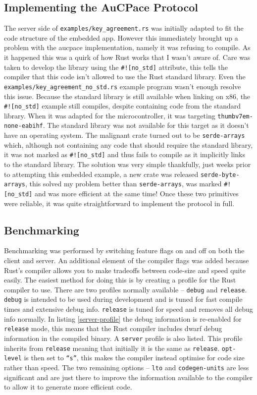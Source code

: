 \subsection{Implementing the AuCPace Protocol}
The server side of \texttt{examples/key\_agreement.rs} was initially adapted to fit the code structure of the embedded app.
However this immediately brought up a problem with the \gls{aucpace} implementation, namely it was refusing to compile.
As it happened this was a quirk of how Rust works that I wasn't aware of.
Care was taken to develop the library using the \verb|#![no_std]| attribute, this tells the compiler that this code isn't allowed to use the Rust standard library.
Even the \texttt{examples/key\_agreement\_no\_std.rs} example program wasn't enough resolve this issue.
Because the standard library is still available when linking on x86, the \verb|#![no_std]| example still compiles, despite containing code from the standard library.
When it was adapted for the microcontroller, it was targeting \texttt{thumbv7em-none-eabihf}.
The standard library was not available for this target as it doesn't have an operating system.
The malignant crate turned out to be \texttt{serde-arrays} which, although not containing any code that should require the standard library, it was not marked as \verb|#![no_std]| and thus fails to compile as it implicitly links to the standard library.
The solution was very simple thankfully, just weeks prior to attempting this embedded example, a new crate was released \texttt{serde-byte-arrays}, this solved my problem better than \texttt{serde-arrays}, was marked \verb|#![no_std]| and was more efficient at the same time!
Once these two primitives were reliable, it was quite straightforward to implement the protocol in full.

\subsection{Benchmarking}
Benchmarking was performed by switching feature flags on and off on both the client and server.
An additional element of the compiler flags was added because Rust's compiler allows you to make tradeoffs between code-size and speed quite easily.
The easiest method for doing this is by creating a profile for the Rust compiler to use.
There are two profiles normally available -- \texttt{debug} and \texttt{release}.
\texttt{debug} is intended to be used during development and is tuned for fast compile times and extensive debug info. \texttt{release} is tuned for speed and removes all debug info normally.
In listing \ref{server-profile} the debug information is re-enabled for \texttt{release} mode, this means that the Rust compiler includes \gls{dwarf} debug information in the compiled binary.
A \texttt{server} profile is also listed.
This profile inherits from \texttt{release} meaning that initially it is the same as \texttt{release}.
\texttt{opt-level} is then set to \texttt{\enquote{s}}, this makes the compiler instead optimise for code size rather than speed.
The two remaining options -- \texttt{lto} and \texttt{codegen-units} are less significant and are just there to improve the information available to the compiler to allow it to generate more efficient code.

